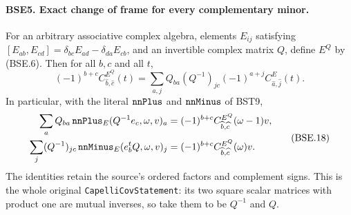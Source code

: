 \documentclass[11pt,a4paper]{article}
\numberwithin{equation}{section}
\theoremstyle{remark}\newtheorem{remark}[theorem]{Remark}
\begin{document}
\paragraph{BSE5. Exact change of frame for every complementary minor.}
\label{claim:BSE5}
For an arbitrary associative complex algebra, elements $E_{ij}$
satisfying
$[E_{ab},E_{cd}]=\delta_{bc}E_{ad}-\delta_{da}E_{cb}$,
and an invertible complex matrix $Q$, define $E^Q$ by
(BSE.6).  Then for all $b,c$ and all $t$,
\[
 (-1)^{b+c}C^{E^Q}_{\widehat b,\widehat c}(t)
 =\sum_{a,j}Q_{ba}(Q^{-1})_{jc}(-1)^{a+j}
                                      C^E_{\widehat a,\widehat j}(t).
 \tag{BSE.17}
\]
In particular, with the literal $\texttt{nn\allowbreak Plus}$ and
$\texttt{nn\allowbreak Minus}$ of BST9,
\[
 \begin{split}
 \sum_a Q_{ba}\,
       \texttt{nn\allowbreak Plus}_E(Q^{-1}e_c,\omega,v)_a
      &=(-1)^{b+c}C^{E^Q}_{\widehat b,\widehat c}(\omega-1)v,\\
 \sum_j(Q^{-1})_{jc}\,
       \texttt{nn\allowbreak Minus}_E(e_b^tQ,\omega,v)_j
      &=(-1)^{b+c}C^{E^Q}_{\widehat b,\widehat c}(\omega)v.
 \end{split}
 \tag{BSE.18}
\]
The identities retain the source's ordered factors and complement
signs.
This is the whole original \texttt{Capelli\allowbreak Cov\allowbreak Statement}:
its two square scalar matrices with product one are mutual
inverses, so take them to be $Q^{-1}$ and $Q$.
\end{document}
